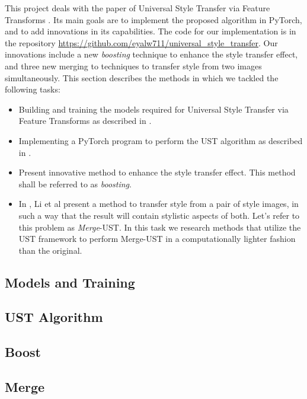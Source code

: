 \hspace{0.5cm} This project deals with the paper of Universal Style Transfer via Feature Transforms \cite{bib11}. Its main goals are to implement the proposed algorithm in PyTorch, and to add innovations in its capabilities. The code for our implementation is in the repository \url{https://github.com/eyalw711/universal_style_transfer}. Our innovations include a new \textit{boosting} technique to enhance the style transfer effect, and three new merging to techniques to transfer style from two images simultaneously. This section describes the methods in which we tackled the following tasks: 
\begin{itemize}
	\item Building and training the models required for Universal Style Transfer via Feature Transforms as described in \cite{bib11}.
	\item Implementing a PyTorch program to perform the UST algorithm as described in \cite{bib11}.
	\item Present innovative method to enhance the style transfer effect. This method shall be referred to as \textit{boosting}.
	\item In \cite{bib11}, Li et al present a method to transfer style from a pair of style images, in such a way that the result will contain stylistic aspects of both. Let's refer to this problem as \textit{Merge}-UST. In this task we research methods that utilize the UST framework to perform Merge-UST in a computationally lighter fashion than the original.
\end{itemize}


\subsection{Models and Training}
\label{models_methods_lbl}


\subsection{UST Algorithm}
\label{algo_methods_lbl}


\subsection{Boost}
\label{boost_methods_lbl}


\subsection{Merge}
\label{merge_methods_lbl}
